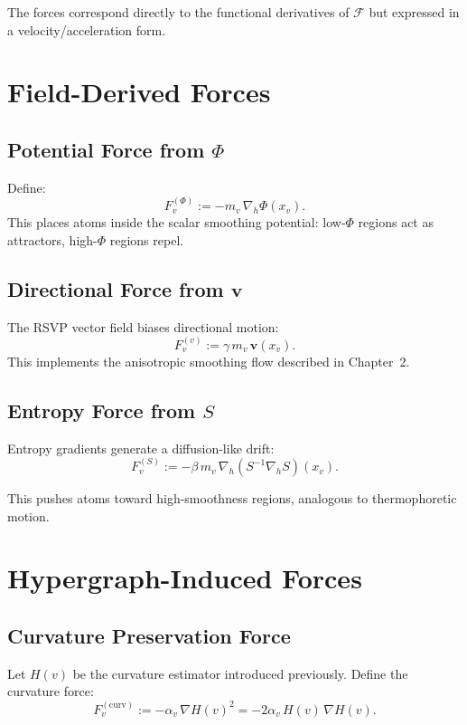 The forces correspond directly to the functional derivatives 
of $\mathcal{F}$ but expressed in a velocity/acceleration form.


\section{Field-Derived Forces}

\subsection{Potential Force from $\Phi$}

Define:
\[
  F^{(\Phi)}_v
    := -m_v \,\nabla_h\Phi(x_v).
\]
This places atoms inside the scalar smoothing potential:
low-$\Phi$ regions act as attractors, high-$\Phi$ regions repel.

\subsection{Directional Force from $\mathbf{v}$}

The RSVP vector field biases directional motion:
\[
  F^{(v)}_v
    := \gamma\,m_v\,\mathbf{v}(x_v).
\]
This implements the anisotropic smoothing flow described in Chapter~2.

\subsection{Entropy Force from $S$}

Entropy gradients generate a diffusion-like drift:
\[
  F^{(S)}_v
    := -\beta\,m_v\,\nabla_h(S^{-1}\nabla_h S)(x_v).
\]

This pushes atoms toward high-smoothness regions,
analogous to thermophoretic motion.


\section{Hypergraph-Induced Forces}

\subsection{Curvature Preservation Force}

Let $H(v)$ be the curvature estimator introduced previously.
Define the curvature force:
\[
  F^{(\mathrm{curv})}_v 
    := -\alpha_v \,\nabla H(v)^2
     = -2\alpha_v\,H(v)\,\nabla H(v).
\]

